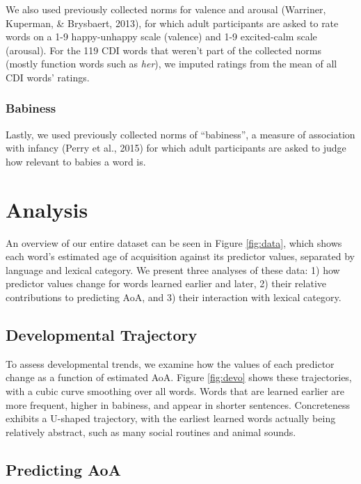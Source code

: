 \documentclass[10pt, letterpaper]{article}
\begin{document}
We also used previously collected norms for valence and arousal
(Warriner, Kuperman, \& Brysbaert, 2013), for which adult participants
are asked to rate words on a 1-9 happy-unhappy scale (valence) and 1-9
excited-calm scale (arousal). For the 119 CDI words that weren't part of
the collected norms (mostly function words such as \emph{her}), we
imputed ratings from the mean of all CDI words' ratings.

\subsubsection{Babiness}\label{babiness}

Lastly, we used previously collected norms of ``babiness'', a measure of
association with infancy (Perry et al., 2015) for which adult
participants are asked to judge how relevant to babies a word is.

\section{Analysis}\label{analysis}

An overview of our entire dataset can be seen in Figure \ref{fig:data},
which shows each word's estimated age of acquisition against its
predictor values, separated by language and lexical category. We present
three analyses of these data: 1) how predictor values change for words
learned earlier and later, 2) their relative contributions to predicting
AoA, and 3) their interaction with lexical category.

\subsection{Developmental Trajectory}\label{developmental-trajectory}

To assess developmental trends, we examine how the values of each
predictor change as a function of estimated AoA. Figure \ref{fig:devo}
shows these trajectories, with a cubic curve smoothing over all words.
Words that are learned earlier are more frequent, higher in babiness,
and appear in shorter sentences. Concreteness exhibits a U-shaped
trajectory, with the earliest learned words actually being relatively
abstract, such as many social routines and animal sounds.

\subsection{Predicting AoA}\label{predicting-aoa}
\end{document}
